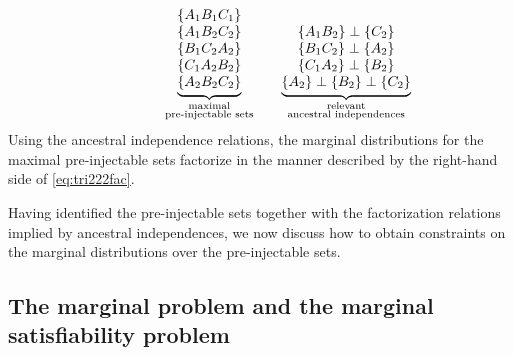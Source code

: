 \documentclass[aps,english,superscriptaddress,onecolumn,twoside,longbibliography,pra,floatfix,fleqn,nofootinbib]{revtex4-1}%
\theoremstyle{definition}
\newcommand{\aindep}{\perp} %
\DeclarePairedDelimiter{\braces}{\lbrace}{\rbrace}
\newcommand{\brackets}[1]{\braces*{#1}}
\begin{document}
\begin{align}
\qquad\qquad
{\underbrace{\begin{matrix}
\brackets{A_1 B_1 C_1} \\
\brackets{A_1 B_2 C_2} \\
\brackets{B_1 C_2 A_2} \\
\brackets{C_1 A_2 B_2} \\
\brackets{A_2 B_2 C_2}
\end{matrix}}_{\substack{\text{maximal}\\\text{pre-injectable sets}}}}
\qquad
{\underbrace{\begin{matrix}
\\
\{A_1 B_2\} \aindep \{ C_2\} \\
\{B_1 C_2\} \aindep \{ A_2\} \\
\{C_1 A_2\} \aindep \{ B_2\} \\
\{A_2\} \aindep \{B_2\} \aindep \{ C_2\}
\end{matrix}}_{\substack{\text{relevant}\\\text{ancestral independences}}}}
\end{align}
Using the ancestral independence relations, the marginal distributions for the maximal pre-injectable sets factorize in the manner described by the right-hand side of \cref{eq:tri222fac}.

Having identified the pre-injectable sets together with the factorization relations implied by ancestral independences, we now discuss how to obtain constraints on the marginal distributions over the pre-injectable sets.

\subsection{The marginal problem and the marginal satisfiability problem}
\label{step:marginalsproblem}
\end{document}
